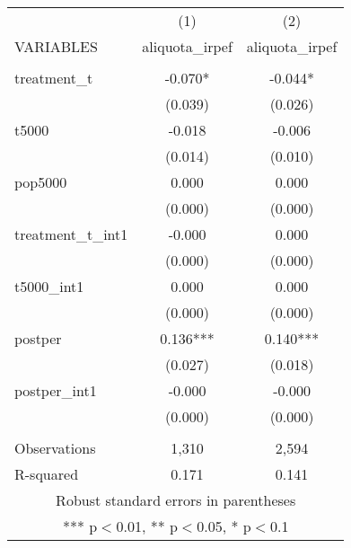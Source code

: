 \documentclass[]{article}
\begin{document}
\begin{tabular}{lcc} \hline
 & (1) & (2) \\
VARIABLES & aliquota\_irpef & aliquota\_irpef \\ \hline
 &  &  \\
treatment\_t & -0.070* & -0.044* \\
 & (0.039) & (0.026) \\
t5000 & -0.018 & -0.006 \\
 & (0.014) & (0.010) \\
pop5000 & 0.000 & 0.000 \\
 & (0.000) & (0.000) \\
treatment\_t\_int1 & -0.000 & 0.000 \\
 & (0.000) & (0.000) \\
t5000\_int1 & 0.000 & 0.000 \\
 & (0.000) & (0.000) \\
postper & 0.136*** & 0.140*** \\
 & (0.027) & (0.018) \\
postper\_int1 & -0.000 & -0.000 \\
 & (0.000) & (0.000) \\
 &  &  \\
Observations & 1,310 & 2,594 \\
 R-squared & 0.171 & 0.141 \\ \hline
\multicolumn{3}{c}{ Robust standard errors in parentheses} \\
\multicolumn{3}{c}{ *** p$<$0.01, ** p$<$0.05, * p$<$0.1} \\
\end{tabular}
\end{document}
